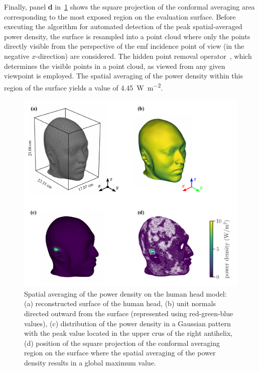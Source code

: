 Finally, panel \textbf{d} in~\cref{fig:head} shows the square projection of the conformal averaging area corresponding to the most exposed region on the evaluation surface.
Before executing the algorithm for automated detection of the peak spatial-averaged power density, the surface is resampled into a point cloud where only the points directly visible from the perspective of the \gls{emf} incidence point of view (in the negative $x$-direction) are considered.
The hidden point removal operator~\cite{Katz2007Direct}, which determines the visible points in a point cloud, as viewed from any given viewpoint is employed.
The spatial averaging of the power density within this region of the surface yields a value of \SI{4.45}{\watt\per\m\squared}.
\begin{figure}[t]
    \centering
    \includegraphics[width=\textwidth]{artwork/head.pdf}
    \caption{Spatial averaging of the power density on the human head model: (a) reconstructed surface of the human head, (b) unit normals directed outward from the surface (represented using red-green-blue values), (c) distribution of the power density in a Gaussian pattern with the peak value located in the upper crus of the right antihelix, (d) position of the square projection of the conformal averaging region on the surface where the spatial averaging of the power density results in a global maximum value.}
    \label{fig:head} 
\end{figure}
